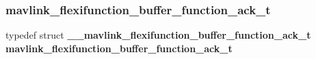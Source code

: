 \subsubsection{mavlink\+\_\+flexifunction\+\_\+buffer\+\_\+function\+\_\+ack\+\_\+t}
{\footnotesize\ttfamily typedef struct \textbf{ \+\_\+\+\_\+mavlink\+\_\+flexifunction\+\_\+buffer\+\_\+function\+\_\+ack\+\_\+t}  \textbf{ mavlink\+\_\+flexifunction\+\_\+buffer\+\_\+function\+\_\+ack\+\_\+t}}

